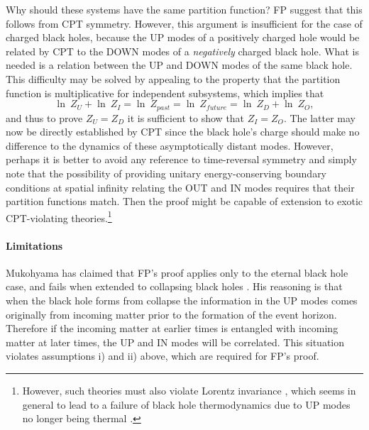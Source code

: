 \documentclass{article}
\begin{document}
Why should these systems have the same partition function?  FP suggest that this follows from CPT symmetry.  However, this argument is insufficient for the case of charged black holes, because the UP modes of a positively charged hole would be related by CPT to the DOWN modes of a \emph{negatively} charged black hole.  What is needed is a relation between the UP and DOWN modes of the same black hole.  This difficulty may be solved by appealing to the property that the partition function is multiplicative for independent subsystems, which implies that
\begin{equation}
\ln \:Z_{U} + \ln \:Z_{I} = \ln \:Z_{past} = \ln \:Z_{future} = \ln \:Z_{D} + \ln \:Z_{O},
\end{equation}
and thus to prove $Z_{U} = Z_{D}$ it is sufficient to show that $Z_{I} = Z_{O}$.  The latter may now be directly established by CPT since the black hole's charge should make no difference to the dynamics of these asymptotically distant modes.  However, perhaps it is better to avoid any reference to time-reversal symmetry and simply note that the possibility of providing unitary energy-conserving boundary conditions at spatial infinity relating the OUT and IN modes requires that their partition functions match.  Then the proof might be capable of extension to exotic CPT-violating theories.\footnote{However, such theories must also violate Lorentz invariance \cite{greenberg06}, which seems in general to lead to a failure of black hole thermodynamics due to UP modes no longer being thermal \cite{EFJW07}.}

\paragraph{Limitations}

Mukohyama has claimed that FP's proof applies only to the eternal black hole case, and fails when extended to collapsing black holes \cite{muko97}.  His reasoning is that when the black hole forms from collapse the information in the UP modes comes originally from incoming matter prior to the formation of the event horizon.  Therefore if the incoming matter at earlier times is entangled with incoming matter at later times, the UP and IN modes will be correlated.  This situation violates assumptions i) and ii) above, which are required for FP's proof.
\end{document}
